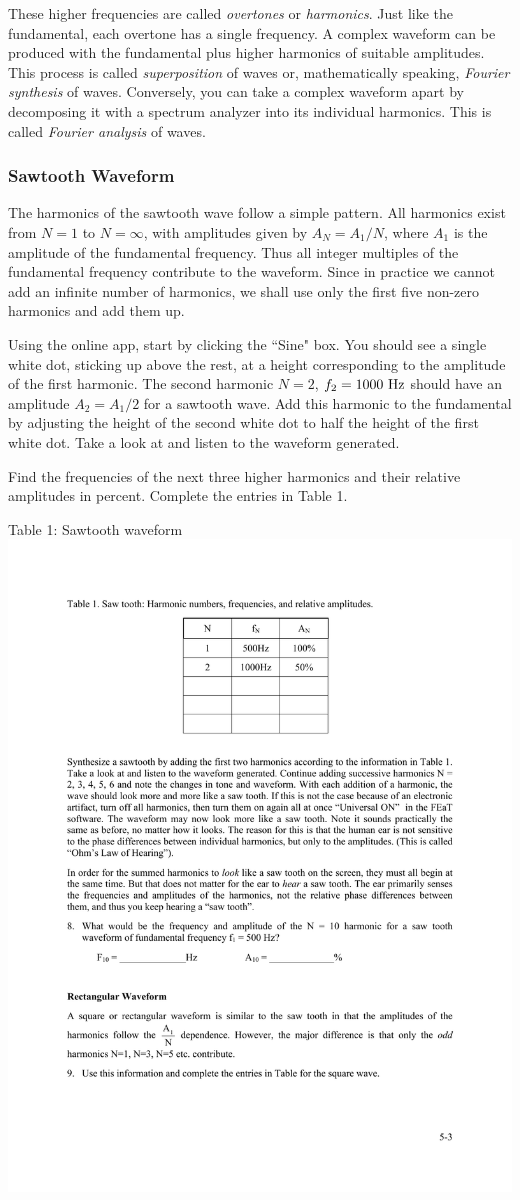 \documentclass[11pt]{NSF}
\def\i{\item{}}
\begin{document}
These higher frequencies are called {\em overtones} or {\em harmonics}. 
Just like the
fundamental, each overtone has a single frequency. A complex waveform can be
produced with the fundamental plus higher harmonics of suitable amplitudes.
This process is called {\em superposition} of waves or, mathematically speaking,
{\em Fourier synthesis} of waves. Conversely, you can take a complex waveform apart
by decomposing it with a spectrum analyzer into its individual harmonics. This is
called {\em Fourier analysis} of waves.

\subsubsection{Sawtooth Waveform}

The harmonics of the sawtooth wave follow a simple pattern. All harmonics
exist from $N=1$ to $N=\infty$, with amplitudes given by 
$A_N = A_1/N$, where $A_1$ is the amplitude of the fundamental frequency.
Thus all integer multiples of the fundamental frequency
contribute to the waveform. 
Since in practice we cannot add an infinite number
of harmonics, we shall use only the first five non-zero
harmonics and add them up.

Using the online app, start by clicking the ``Sine" box.
You should see a single white dot, sticking up above the rest,
at a height corresponding to the amplitude of the first harmonic.
The second harmonic $N=2$, $f_2=1000~{\rm Hz}$ should have an 
amplitude $A_2=A_1/2$ for a sawtooth wave. 
Add this harmonic to the fundamental by adjusting the height 
of the second white dot to half the height of the first white dot. 
Take a look at and listen to the waveform generated.

Find the frequencies of the next three higher harmonics 
and their relative amplitudes in percent. 
Complete the entries in Table 1.
%
\begin{table}[hbtp]
\begin{center}
Table 1: Sawtooth waveform\\
\includegraphics[width=.35\textwidth]{tab5_1}
\label{t:1}
\end{center}
\end{table}
%
\end{document}
